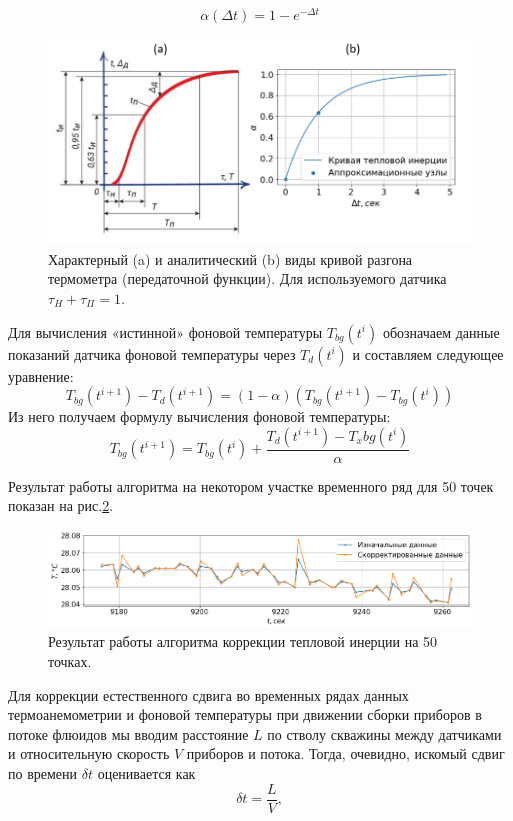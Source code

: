 \begin{equation}
    \alpha(\Delta t) = 1 - e ^ {-\Delta t}
\end{equation}

\begin{figure}[H]
\centering
\includegraphics[width=1.0\textwidth]{TA/thermal_inertia_curve.png}
\caption{Характерный (a) и аналитический (b) виды кривой разгона термометра (передаточной функции). Для используемого датчика $\tau_H+\tau_\Pi=1$.}
\label{fig:thermal_inertia_curve}
\end{figure}

\par
Для вычисления «истинной» фоновой температуры $T_{bg}(t^i)$ обозначаем данные показаний датчика фоновой температуры через $T_d(t^i)$ и составляем следующее уравнение:
\begin{equation}
    T_{bg}(t^{i+1})-T_d(t^{i+1})=    \left(1-\alpha\right)\left(T_{bg}(t^{i+1})-T_{bg}(t^i)\right)
\end{equation}
Из него получаем формулу вычисления фоновой температуры:
\begin{equation}
    T_{bg}(t^{i+1})=T_{bg}(t^i)+\frac{T_d(t^{i+1})-T_x{bg}(t^i)}{\alpha}
\end{equation}

Результат работы алгоритма на некотором участке временного ряд для 50 точек показан на рис.\ref{fig:thermal_inertia_result}.
\begin{figure}[H]
\centering
\includegraphics[width=1.0\textwidth]{TA/thermal_inertia_result.png}
\caption{Результат работы алгоритма коррекции тепловой инерции на 50 точках.}
\label{fig:thermal_inertia_result}
\end{figure}
\par
Для коррекции естественного сдвига во временных рядах данных термоанемометрии и фоновой температуры при движении сборки приборов в потоке флюидов мы вводим расстояние $L$ по стволу скважины между датчиками и относительную скорость $V$ приборов и потока. Тогда, очевидно, искомый сдвиг по времени $\delta t$ оценивается как
\begin{equation}
    \delta t = \frac{L}{V},
\end{equation}

